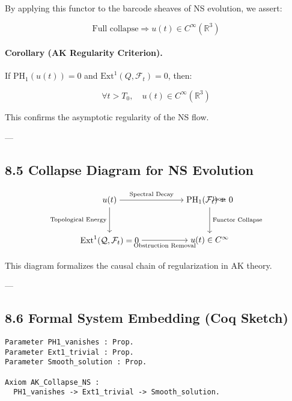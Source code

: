 \documentclass[11pt]{article}
\begin{document}
By applying this functor to the barcode sheaves of NS evolution, we assert:

\[
\text{Full collapse} \Rightarrow u(t) \in C^\infty(\mathbb{R}^3)
\]

\paragraph{Corollary (AK Regularity Criterion).}
If \( \mathrm{PH}_1(u(t)) = 0 \) and \( \mathrm{Ext}^1(Q, \mathcal{F}_t) = 0 \), then:

\[
\forall t > T_0,\quad u(t) \in C^\infty(\mathbb{R}^3)
\]

This confirms the asymptotic regularity of the NS flow.

---

\subsection*{8.5 Collapse Diagram for NS Evolution}

\[
\begin{tikzpicture}[every node/.style={anchor=center}]
  \matrix (m) [matrix of math nodes, row sep=3em, column sep=5em] {
    u(t) & {\mathrm{PH}_1(\mathcal{F}_t) = 0} \\
    {\mathrm{Ext}^1(\mathcal{Q}, \mathcal{F}_t) = 0} & u(t) \in C^\infty \\
  };

  \path[->]
    (m-1-1) edge node[above]{\scriptsize Spectral Decay} (m-1-2)
    (m-1-1) edge node[left]{\scriptsize Topological Energy} (m-2-1)
    (m-1-2) edge node[right]{\scriptsize Functor Collapse} (m-2-2)
    (m-2-1) edge node[below]{\scriptsize Obstruction Removal} (m-2-2);

  \path[->, bend left=50] (m-1-2.north east) to node[above right]{\scriptsize loop} (m-1-2.north west);
\end{tikzpicture}
\]


This diagram formalizes the causal chain of regularization in AK theory.

---

\subsection*{8.6 Formal System Embedding (Coq Sketch)}

\begin{lstlisting}[language=Coq]
Parameter PH1_vanishes : Prop.
Parameter Ext1_trivial : Prop.
Parameter Smooth_solution : Prop.

Axiom AK_Collapse_NS :
  PH1_vanishes -> Ext1_trivial -> Smooth_solution.
\end{lstlisting}
\end{document}
